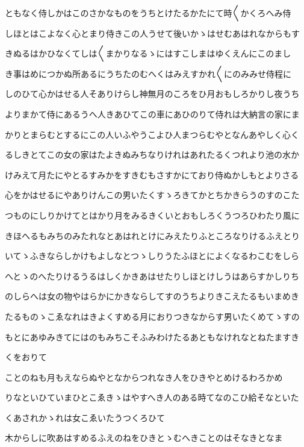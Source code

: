 \documentclass[a4paper,11pt,landscape]{ltjtarticle}
\begin{document}
\par\medskip
ともなく侍しかはこのさかなものをうちとけたるかたにて時〱かくろへみ侍
\par\medskip
しほとはこよなく心とまり侍きこの人うせて後いかゝはせむあはれなからもす
\par\medskip
きぬるはかひなくてしは〱まかりなるゝにはすこしまはゆくえんにこのまし
\par\medskip
き事はめにつかぬ所あるにうちたのむへくはみえすかれ〱にのみみせ侍程に
\par\medskip
しのひて心かはせる人そありけらし神無月のころをひ月おもしろかりし夜うち
\par\medskip
よりまかて侍にあるうへ人きあひてこの車にあひのりて侍れは大納言の家にま
\par\medskip
かりとまらむとするにこの人いふやうこよひ人まつらむやとなんあやしく心く
\par\medskip
るしきとてこの女の家はたよきぬみちなりけれはあれたるくつれより池の水か
\par\medskip
けみえて月たにやとるすみかをすきむもさすかにており侍ぬかしもとよりさる
\par\medskip
心をかはせるにやありけんこの男いたくすゝろきてかとちかきらうのすのこた
\par\medskip
つものにしりかけてとはかり月をみるきくいとおもしろくうつろひわたり風に
\par\medskip
きほへるもみちのみたれなとあはれとけにみえたりふところなりけるふえとり
\par\medskip
いてゝふきならしかけもよしなとつゝしりうたふほとによくなるわこむをしら
\par\medskip
へとゝのへたりけるうるはしくかきあはせたりしほとけしうはあらすかしりち
\par\medskip
のしらへは女の物やはらかにかきならしてすのうちよりきこえたるもいまめき
\par\medskip
たるものゝこゑなれはきよくすめる月におりつきなからす男いたくめてゝすの
\par\medskip
もとにあゆみきてにはのもみちこそふみわけたるあともなけれなとねたますき
\par\medskip
くをおりて
\par\medskip
ことのねも月もえならぬやとなからつれなき人をひきやとめけるわろかめ
\par\medskip
りなといひていまひとこゑきゝはやすへき人のある時てなのこひ給そなといた
\par\medskip
くあされかゝれは女こゑいたうつくろひて
\par\medskip
木からしに吹あはすめるふえのねをひきとゝむへきことのはそなきとなま
\end{document}
